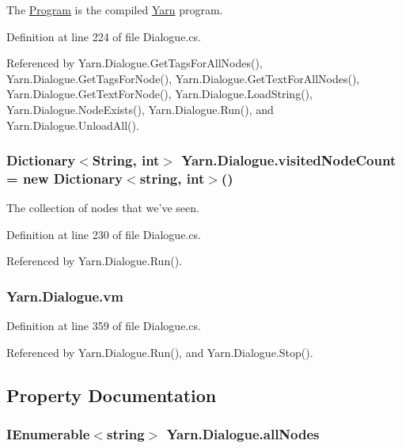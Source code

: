 The \hyperlink{a00140}{Program} is the compiled \hyperlink{a00050}{Yarn} program. 



Definition at line 224 of file Dialogue.\-cs.



Referenced by Yarn.\-Dialogue.\-Get\-Tags\-For\-All\-Nodes(), Yarn.\-Dialogue.\-Get\-Tags\-For\-Node(), Yarn.\-Dialogue.\-Get\-Text\-For\-All\-Nodes(), Yarn.\-Dialogue.\-Get\-Text\-For\-Node(), Yarn.\-Dialogue.\-Load\-String(), Yarn.\-Dialogue.\-Node\-Exists(), Yarn.\-Dialogue.\-Run(), and Yarn.\-Dialogue.\-Unload\-All().

\hypertarget{a00090_aae9e64354066a1e2fa130629959d772b}{
\subsubsection[{visited\-Node\-Count}]{\setlength{\rightskip}{0pt plus 5cm}Dictionary$<${\bf String}, int$>$ Yarn.\-Dialogue.\-visited\-Node\-Count = new Dictionary$<$string, int$>$()}}\label{a00090_aae9e64354066a1e2fa130629959d772b}


The collection of nodes that we've seen. 



Definition at line 230 of file Dialogue.\-cs.



Referenced by Yarn.\-Dialogue.\-Run().

\hypertarget{a00090_a8c1319357a9df6cff051328fb33224c7}{
\subsubsection[{vm}]{ Yarn.\-Dialogue.\-vm\hspace{0.3cm}{\ttfamily [private]}}}\label{a00090_a8c1319357a9df6cff051328fb33224c7}


Definition at line 359 of file Dialogue.\-cs.



Referenced by Yarn.\-Dialogue.\-Run(), and Yarn.\-Dialogue.\-Stop().



\subsection{Property Documentation}
\hypertarget{a00090_a0ee573e3d072bccf98ba1d975612d42c}{
\subsubsection[{all\-Nodes}]{\setlength{\rightskip}{0pt plus 5cm}I\-Enumerable$<$string$>$ Yarn.\-Dialogue.\-all\-Nodes\hspace{0.3cm}{\ttfamily [get]}}}\label{a00090_a0ee573e3d072bccf98ba1d975612d42c}


